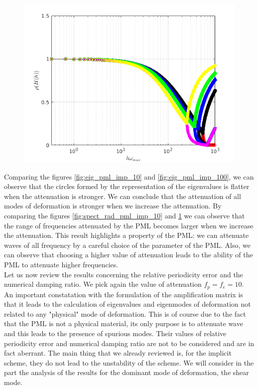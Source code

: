 \begin{itemize}
\begin{figure}[H]
\begin{minipage}{.5\textwidth}
  \includegraphics[width=1.\linewidth]{images/spect_rad_pml_imp_100.png}
  \label{fig:spect_rad_pml_imp_100}
\end{minipage}
\end{figure} 
Comparing the figures \ref{fig:eig_pml_imp_10} and \ref{fig:eig_pml_imp_100}, we can observe that the circles formed by the representation of the eigenvalues is flatter when the attenuation is stronger. We can conclude that the attenuation of all modes of deformation is stronger when we increase the attenuation. By comparing the figures \ref{fig:spect_rad_pml_imp_10} and \ref{fig:spect_rad_pml_imp_100} we can observe that the range of frequencies attenuated by the PML becomes larger when we increase the attenuation. This result highlights a property of the PML: we can attenuate waves of all frequency by a careful choice of the parameter of the PML. Also, we can observe that choosing a higher value of attenuation leads to the ability of the PML to attenuate higher frequencies. \\
Let us now review the results concerning the relative periodicity error and the numerical damping ratio. We pick again the value of attenuation $f_p = f_e = 10$. An important constatation with the formulation of the amplification matrix is that it leads to the calculation of eigenvalues and eigenmodes of deformation not related to any "physical" mode of deformation. This is of course due to the fact that the PML is not a physical material, its only purpose is to attenuate wave and this leads to the presence of spurious modes. Their values of relative periodicity error and numerical damping ratio are not to be considered and are in fact aberrant. The main thing that we already reviewed is, for the implicit scheme, they do not lead to the unstability of the scheme. We will consider in the part the analysis of the results for the dominant mode of deformation, the shear mode.  

\end{itemize}
